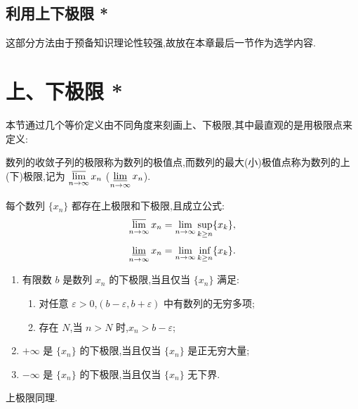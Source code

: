 \subsection{利用上下极限 *}

这部分方法由于预备知识理论性较强,故放在本章最后一节作为选学内容.


\newpage

\section{上、下极限 *}

本节通过几个等价定义由不同角度来刻画上、下极限,其中最直观的是用极限点来定义:

\begin{definition}
  数列的收敛子列的极限称为数列的极值点,而数列的最大(小)极值点称为数列的上(下)极限,记为
  $\displaystyle \varlimsup\limits_{n\to\infty}x_n$
  ($\displaystyle \varliminf\limits_{n\to\infty}x_n$).
\end{definition}

\begin{proposition}
  每个数列 $\{x_n\}$ 都存在上极限和下极限,且成立公式:
  \[
    \varlimsup\limits_{n\to\infty}x_n
    =
    \lim\limits_{n\to\infty}\sup_{k\geq n}\{x_k\},
  \]
  \[
    \varliminf\limits_{n\to\infty}x_n
    =
    \lim\limits_{n\to\infty}\inf_{k\geq n}\{x_k\}.
  \]
\end{proposition}

\begin{proposition}
  \begin{enumerate}
    \item 有限数 $b$ 是数列 $x_n$ 的下极限,当且仅当 $\{x_n\}$ 满足:
          \begin{enumerate}[label=(\roman*)]
            \item 对任意 $\varepsilon>0$,$(b-\varepsilon,b+\varepsilon)$ 中有数列的无穷多项;
            \item 存在 $N$,当 $n>N$ 时,$x_n>b-\varepsilon$;
          \end{enumerate}
    \item $+\infty$ 是 $\{x_n\}$ 的下极限,当且仅当 $\{x_n\}$ 是正无穷大量;
    \item $-\infty$ 是 $\{x_n\}$ 的下极限,当且仅当 $\{x_n\}$ 无下界.
  \end{enumerate}
  上极限同理.
\end{proposition}

